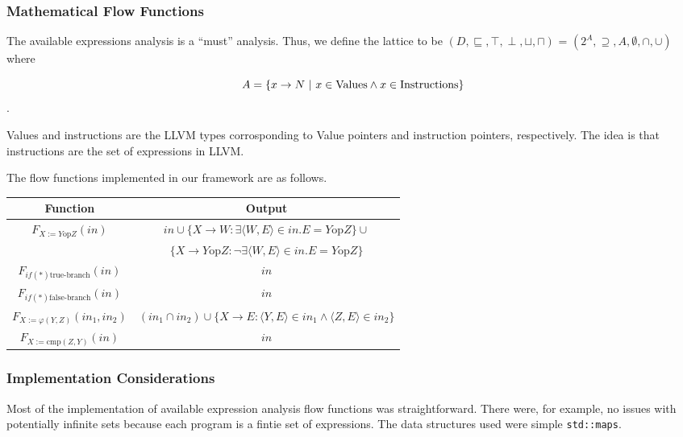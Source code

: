 \documentclass{article}
\theoremstyle{definition}
\begin{document}
\subsubsection{Mathematical Flow Functions}
The available expressions analysis is a ``must'' analysis. Thus, we
define the lattice to be $(D, \sqsubseteq, \top, \perp, \sqcup,
\sqcap)$ = $(2^A, \supseteq, A, \emptyset, \cap, \cup)$ where

\[ A = \{x \rightarrow N~|~x \in \textup{Values} \wedge x \in \textup{Instructions}\} \].

Values and instructions are the LLVM types corrosponding to Value
pointers and instruction pointers, respectively. The idea is that
instructions are the set of expressions in LLVM.

The flow functions implemented in our framework are as follows.

\begin{center}
\begin{tabular}{c | c} %
Function & Output \\ [0.5ex] %
\hline %
$F_{X:= Y \text{op} Z}(in)$ & $in \cup \{ X \rightarrow W : \exists \langle W, E\rangle \in in.  E = Y \text{op} Z\} \cup$ \\
& $\{ X \rightarrow Y \text{op} Z : \neg\exists \langle W, E\rangle \in in.  E = Y \text{op} Z\}$\\
$F_{if(*) \text{true-branch}}(in)$ & $in$ \\ 
$F_{if(*) \text{false-branch}}(in)$ & $in$ \\ 
$F_{X := \varphi(Y,Z)}(in_1, in_2)$ & $(in_1 \cap in_2) \cup \{X \rightarrow E : \langle Y, E \rangle \in in_1 \wedge \langle Z,E \rangle \in in_2 \}$\\
$F_{X := \text{cmp}(Z,Y)}(in)$ & $in$\\
 [1ex] %
\hline %
\end{tabular} 
\end{center}
\subsubsection{Implementation Considerations}
Most of the implementation of available expression analysis flow
functions was straightforward. There were, for example, no issues with
potentially infinite sets because each program is a fintie set of
expressions. The data structures used were simple
\texttt{std::maps}. 
\end{document}
